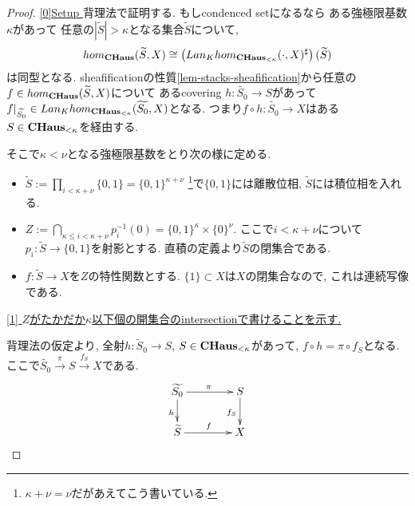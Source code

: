 \documentclass[dvipdfmx,a4paper,11pt]{article}
\newcommand{\colim}{{\rm colim}}
\theoremstyle{definition}
\begin{document}
 \begin{proof}

\underline{[0]Setup }
 背理法で証明する. 
もしcondenced setになるなら
 ある強極限基数$\kappa$があって
任意の$|\widetilde{S}|> \kappa$となる集合$\widetilde{S}$について,
$$
hom_{{\bf CHaus}}(\widetilde{S},  X) 
\cong   \left( Lan_{K}hom_{{\bf CHaus}_{< \kappa}}(\cdot,  X )^{\sharp} \right)(\widetilde{S})
$$
は同型となる. 
sheafificationの性質\ref{lem-stacks-sheafification}から任意の$f \in hom_{{\bf CHaus}}(\widetilde{S},  X) $について
あるcovering $h : \widetilde{S_0} \to S$があって
$f|_{\widetilde{S_0}} \in  Lan_{K}
hom_{{\bf CHaus}_{< \kappa}}(\widetilde{S_0},  X )$となる.
つまり$f \circ h : \widetilde{S_0} \to X$はある$S \in {\bf CHaus}_{< \kappa}$を経由する. 



そこで$\kappa < \nu$となる強極限基数をとり次の様に定める.
\begin{itemize}
\item $\widetilde{S} := \prod_{i < \kappa +\nu} \{0,1\} =\{0,1\}^{\kappa + \nu}$ \footnote{$\kappa + \nu=\nu$だがあえてこう書いている. }で$\{ 0,1\}$には離散位相, $\widetilde{S}$には積位相を入れる.
\item  $Z := \bigcap_{\kappa \le  i < \kappa +\nu} p^{-1}_{i}(0) = \{0,1\}^{\kappa} \times \{ 0\}^{\nu}$. ここで$i < \kappa +\nu$について$p_i : \widetilde{S} \to \{0,1 \}$を射影とする. %
直積の定義より$\widetilde{S}$の閉集合である.
\item $f : \widetilde{S} \to X$を$Z$の特性関数とする. $\{1\} \subset X$は$X$の閉集合なので, これは連続写像である. 
\end{itemize}

\underline{[1] $Z$がたかだか$\kappa$以下個の開集合のintersectionで書けることを示す.} 

背理法の仮定より, 全射$h : \widetilde{S}_0 \to S$,  $S \in {\bf CHaus}_{< \kappa}$があって, 
$f \circ h = \pi \circ f_{S}$となる. ここで$\widetilde{S_0} \overset{\pi}{\to} S \overset{f_S}{\to} X$である.
\begin{equation*}
\xymatrix@C=40pt@R=20pt{
\widetilde{S_0} \ar@{->}[d]_{h}\ar@{->}[r]^{\pi}
& S\ar@{->}[d]_{f_{S}}
\\
\widetilde{S} \ar@{->}[r]^{f}&
X
}
\end{equation*}


\end{proof}
\end{document}
